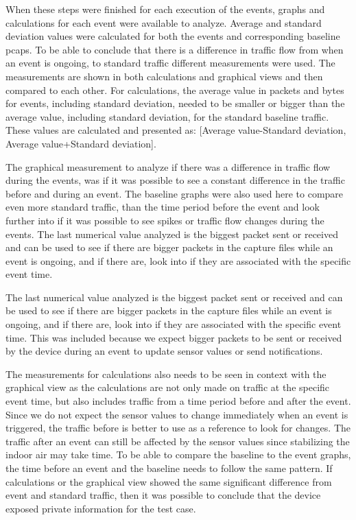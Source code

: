When these steps were finished for each execution of the events, graphs and calculations for each event were available to analyze. Average and standard deviation values were calculated for both the events and corresponding baseline \gls{pcaps}. To be able to conclude that there is a difference in traffic flow from when an event is ongoing, to standard traffic different measurements were used. The measurements are shown in both calculations and graphical views and then compared to each other. For calculations, the average value in packets and bytes for events, including standard deviation, needed to be smaller or bigger than the average value, including standard deviation, for the standard baseline traffic. These values are calculated and presented as: [Average value-Standard deviation, Average value+Standard deviation]. 

The graphical measurement to analyze if there was a difference in traffic flow during the events, was if it was possible to see a constant difference in the traffic before and during an event. The baseline graphs were also used here to compare even more standard traffic, than the time period before the event and look further into if it was possible to see spikes or traffic flow changes during the events. The last numerical value analyzed is the biggest packet sent or received and can be used to see if there are bigger packets in the capture files while an event is ongoing, and if there are, look into if they are associated with the specific event time.

The last numerical value analyzed is the biggest packet sent or received and can be used to see if there are bigger packets in the capture files while an event is ongoing, and if there are, look into if they are associated with the specific event time. This was included because we expect bigger packets to be sent or received by the device during an event to update sensor values or send notifications. 

The measurements for calculations also needs to be seen in context with the graphical view as the calculations are not only made on traffic at the specific event time, but also includes traffic from a time period before and after the event. Since we do not expect the sensor values to change immediately when an event is triggered, the traffic before is better to use as a reference to look for changes. The traffic after an event can still be affected by the sensor values since stabilizing the indoor air may take time. To be able to compare the baseline to the event graphs, the time before an event and the baseline needs to follow the same pattern. If calculations or the graphical view showed the same significant difference from event and standard traffic, then it was possible to conclude that the device exposed private information for the test case. 